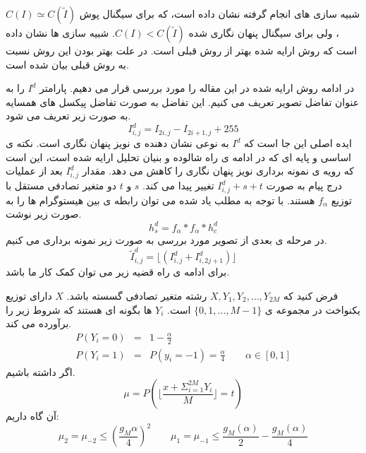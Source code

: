 شبیه سازی های انجام گرفته نشان داده است، که برای سیگنال پوش $ C(I)\simeq C(\tilde{I} ) $، ولی برای سیگنال پنهان نگاری شده { $ C(I) < C(\tilde{I} ) $}. شبیه سازی ها نشان داده است که روش ارایه شده بهتر از روش قبلی است. در \cite{Ker2005a_Resampling} علت بهتر بودن این روش نسبت به روش قبلی بیان شده است. 
 
 در ادامه روش ارایه شده در این مقاله را مورد بررسی قرار می دهیم. پارامتر $ I^{d} $ را به عنوان تفاضل تصویر تعریف می کنیم. این تفاضل به صورت تفاضل پیکسل های همسایه به صورت زیر تعریف می شود. 
 \begin{equation}
\label{method}
I^{d}_{i,j}=I_{2i,j}-I_{2i+1,j}+255
\end{equation}
ایده اصلی این جا است که $I^{d} $ به نوعی نشان دهنده ی نویز پنهان نگاری است. نکته ی اساسی و پایه ای که در ادامه ی راه شالوده و بنیان تحلیل ارایه شده است، این است که رویه ی نمونه برداری نویز پنهان نگاری را کاهش می دهد. مقدار $ I^{d}_{i,j} $ بعد از عملیات درج پیام به صورت $ I^{d}_{i,j}+s+t $ تغییر پیدا می کند. $ s $ و $ t $ دو متغیر تصادفی مستقل با توزیع $ f_{\alpha } $ هستند. با توجه به مطلب یاد شده می توان رابطه ی بین هیستوگرام ها را به صورت زیر نوشت.
\begin{equation}
h^{d}_{s}=f_{\alpha }*f_{\alpha }*h_{c}^{d}
\end{equation}
در مرحله ی بعدی از تصویر مورد بررسی به صورت زیر نمونه برداری می کنیم.
\begin{equation}
\tilde{I}^{d}_{i,j}=\lfloor (I^{d}_{i,j}+I^{d}_{i,2j+1})\rfloor
\end{equation}
برای ادامه ی راه قضیه زیر می توان کمک کار ما باشد.
\begin{theorem}
فرض کنید که $ X,Y_{1},Y_{2},\ldots ,Y_{2M} $ رشته متغیر تصادفی گسسته باشد. $ X $ دارای توزیع یکنواخت در مجموعه ی $ \{ 0,1,\ldots , M-1\} $ است. $ Y_{i} $ ها بگونه ای هستند که شروط زیر را برآورده می کند.
\begin{eqnarray}
P(Y_{i}=0)&=&1-\frac{\alpha }{2}\nonumber \\
P(Y_{i}=1)&=&P(y_{i}=-1)=\frac{\alpha }{4}\qquad \alpha \in [0,1]
\end{eqnarray}
اگر داشته باشیم.
\begin{equation}
\mu =P\left( \lfloor \frac{x+\Sigma _{i=1}^{2M}Y_{i}}{M}\rfloor =t \right) 
\end{equation}
آن گاه داریم:
\begin{equation}
\mu _{2}=\mu _{-2}\leq (\frac{g_{M}\alpha }{4})^{2}\qquad \mu _{1}=\mu _{-1}\leq \frac{g_{M}(\alpha )}{2}-\frac{g_{M}(\alpha )}{4}
\end{equation}
\end{theorem}

